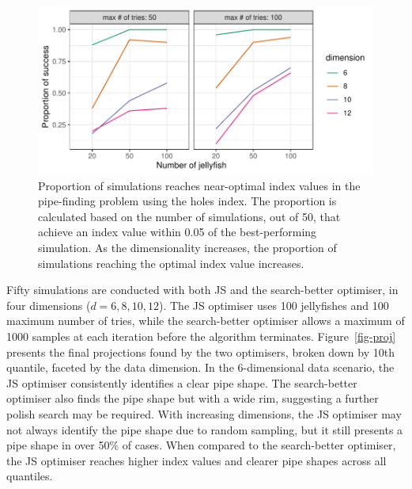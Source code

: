 \documentclass[
  number,
  preprint,
  3p]{elsarticle}
\begin{document}
\begin{figure}

{\centering \includegraphics{optim_files/figure-pdf/fig-proportion-1.pdf}

}

\caption{\label{fig-proportion}Proportion of simulations reaches
near-optimal index values in the pipe-finding problem using the holes
index. The proportion is calculated based on the number of simulations,
out of 50, that achieve an index value within 0.05 of the
best-performing simulation. As the dimensionality increases, the
proportion of simulations reaching the optimal index value increases.}

\end{figure}

Fifty simulations are conducted with both JS and the search-better
optimiser, in four dimensions (\(d = 6, 8, 10, 12\)). The JS optimiser
uses 100 jellyfishes and 100 maximum number of tries, while the
search-better optimiser allows a maximum of 1000 samples at each
iteration before the algorithm terminates. Figure~\ref{fig-proj}
presents the final projections found by the two optimisers, broken down
by 10th quantile, faceted by the data dimension. In the 6-dimensional
data scenario, the JS optimiser consistently identifies a clear pipe
shape. The search-better optimiser also finds the pipe shape but with a
wide rim, suggesting a further polish search may be required. With
increasing dimensions, the JS optimiser may not always identify the pipe
shape due to random sampling, but it still presents a pipe shape in over
50\% of cases. When compared to the search-better optimiser, the JS
optimiser reaches higher index values and clearer pipe shapes across all
quantiles.
\end{document}

